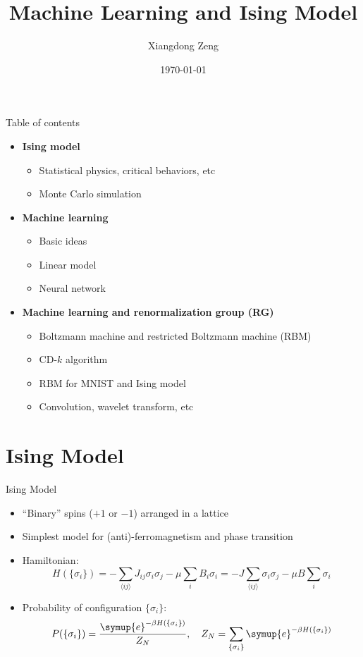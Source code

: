\documentclass[aspectratio=169]{beamer}
\title{Machine Learning and Ising Model}
\date{\today}
\author{Xiangdong Zeng}
\institute{Department of Physics, Fudan University}
\def\ee{{\symup{e}}}
\def\nearest#1{\langle#1\rangle}
\def\q#1{{\{#1\}}}
\def\CDk{CD-$k$}
\begin{document}
\maketitle

\begin{frame}{Table of contents}
\begin{itemize}
  \item \textbf{Ising model}
    \begin{itemize}
      \item Statistical physics, critical behaviors, etc
      \item Monte Carlo simulation
    \end{itemize}
  \item \textbf{Machine learning}
    \begin{itemize}
      \item Basic ideas
      \item Linear model
      \item Neural network
    \end{itemize}
  \item \textbf{Machine learning and renormalization group (RG)}
    \begin{itemize}
      \item Boltzmann machine and restricted Boltzmann machine (RBM)
      \item \CDk{} algorithm
      \item RBM for MNIST and Ising model
      \item Convolution, wavelet transform, etc
    \end{itemize}
\end{itemize}
\end{frame}

\section{Ising Model}

\begin{frame}{Ising Model}
\begin{itemize}
  \item ``Binary'' spins ($+1$ or $-1$) arranged in a lattice
  \item Simplest model for (anti)-ferromagnetism and phase transition
  \item Hamiltonian:
    \[
      H(\q{\sigma_i}) = -\sum_{\nearest{ij}} J_{ij}\sigma_i\sigma_j - \mu \sum_{i} B_i\sigma_i
                      = -J \sum_{\nearest{ij}} \sigma_i\sigma_j - \mu B \sum_{i} \sigma_i
    \]
  \item Probability of configuration $\q{\sigma_i}$:
    \[
      P(\q{\sigma_i}) = \frac{\ee^{-\beta H(\q{\sigma_i})}}{Z_N} \qc
      Z_N = \sum_\q{\sigma_i} \ee^{-\beta H(\q{\sigma_i})}
    \]
\end{itemize}
\end{frame}
\end{document}
